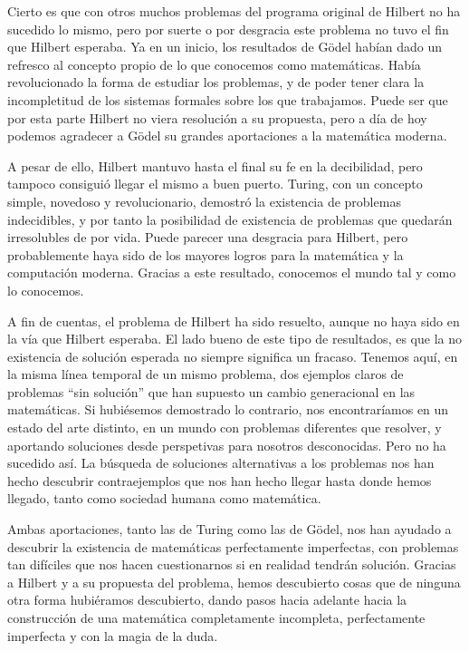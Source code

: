 Cierto es que con otros muchos problemas del programa original de Hilbert no ha sucedido lo mismo, pero por suerte o por desgracia
este problema no tuvo el fin que Hilbert esperaba. Ya en un inicio, los resultados de Gödel habían dado un refresco al concepto propio
de lo que conocemos como matemáticas. Había revolucionado la forma de estudiar los problemas, y de poder tener clara la incompletitud
de los sistemas formales sobre los que trabajamos. Puede ser que por esta parte Hilbert no viera resolución a su propuesta, pero a día 
de hoy podemos agradecer a Gödel su grandes aportaciones a la matemática moderna. 

A pesar de ello, Hilbert mantuvo hasta el final su fe en la decibilidad, pero tampoco consiguió llegar el mismo a buen puerto. Turing, 
con un concepto simple, novedoso y revolucionario, demostró la existencia de problemas indecidibles, y por tanto la posibilidad de existencia
de problemas que quedarán irresolubles de por vida. Puede parecer una desgracia para Hilbert, pero probablemente haya sido de los mayores 
logros para la matemática y la computación moderna. Gracias a este resultado, conocemos el mundo tal y como lo conocemos. 

A fin de cuentas, el problema de Hilbert ha sido resuelto, aunque no haya sido en la vía que Hilbert esperaba. El lado bueno de este 
tipo de resultados, es que la no existencia de solución esperada no siempre significa un fracaso. Tenemos aquí, en la misma línea temporal
de un mismo problema, dos ejemplos claros de problemas ``sin solución'' que han supuesto un cambio generacional en las matemáticas. Si hubiésemos demostrado lo contrario, nos encontraríamos en un estado del arte distinto, en un mundo con problemas diferentes que resolver,
y aportando soluciones desde perspetivas para nosotros desconocidas. Pero no ha sucedido así. La búsqueda de soluciones alternativas a los 
problemas nos han hecho descubrir contraejemplos que nos han hecho llegar hasta donde hemos llegado, tanto como sociedad humana como matemática.

Ambas aportaciones, tanto las de Turing como las de Gödel, nos han ayudado a descubrir la existencia de matemáticas perfectamente imperfectas,
con problemas tan difíciles que nos hacen cuestionarnos si en realidad tendrán solución. Gracias a Hilbert y a su propuesta del problema, 
hemos descubierto cosas que de ninguna otra forma hubiéramos descubierto, dando pasos hacia adelante hacia la construcción de una matemática
completamente incompleta, perfectamente imperfecta y con la magia de la duda.

\endinput

